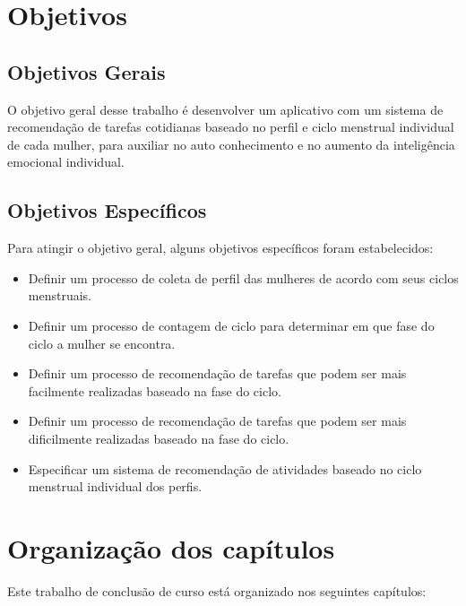 \section{Objetivos}

\subsection{Objetivos Gerais}

O objetivo geral desse trabalho é desenvolver um aplicativo com um sistema de recomendação de tarefas cotidianas baseado no perfil e ciclo menstrual individual de cada mulher, para auxiliar no auto conhecimento e no aumento da inteligência emocional individual.

\subsection{Objetivos Específicos}

Para atingir o objetivo geral, alguns objetivos específicos foram estabelecidos:

\begin{itemize}

        \item Definir um processo de coleta de perfil das mulheres de acordo com seus ciclos menstruais.

        \item Definir um processo de contagem de ciclo para determinar em que fase do ciclo a mulher se encontra. 

        \item Definir um processo de recomendação de tarefas que podem ser  mais facilmente realizadas baseado na fase do ciclo. 

        \item Definir um processo de recomendação de tarefas que podem ser mais dificilmente realizadas baseado na fase do ciclo.

        \item Especificar um sistema de recomendação de atividades baseado no ciclo menstrual individual dos perfis. 

\end{itemize}

\section{Organização dos capítulos}

Este trabalho de conclusão de curso está organizado nos seguintes capítulos:

